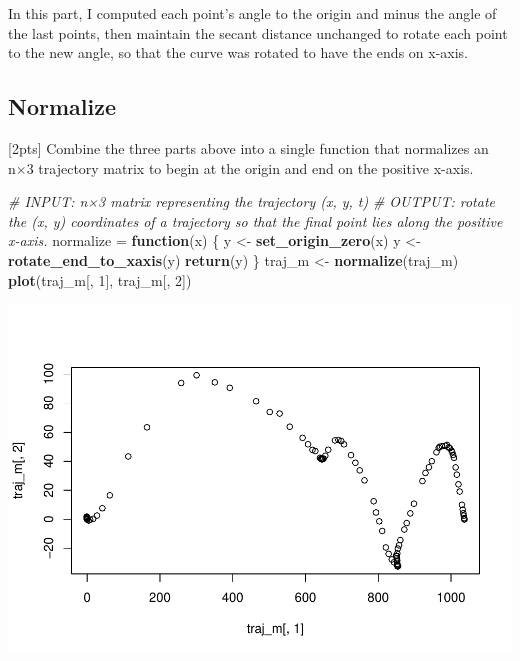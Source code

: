 \documentclass[]{article}
\newenvironment{Shaded}{\begin{snugshade}}{\end{snugshade}}
\newcommand{\CommentTok}[1]{\textcolor[rgb]{0.56,0.35,0.01}{\textit{#1}}}
\newcommand{\ControlFlowTok}[1]{\textcolor[rgb]{0.13,0.29,0.53}{\textbf{#1}}}
\newcommand{\DecValTok}[1]{\textcolor[rgb]{0.00,0.00,0.81}{#1}}
\newcommand{\KeywordTok}[1]{\textcolor[rgb]{0.13,0.29,0.53}{\textbf{#1}}}
\newcommand{\NormalTok}[1]{#1}
\newcommand{\StringTok}[1]{\textcolor[rgb]{0.31,0.60,0.02}{#1}}
\begin{document}
In this part, I computed each point's angle to the origin and minus the
angle of the last points, then maintain the secant distance unchanged to
rotate each point to the new angle, so that the curve was rotated to
have the ends on x-axis.

\hypertarget{normalize}{%
\subsection{Normalize}\label{normalize}}

{[}2pts{]} Combine the three parts above into a single function that
normalizes an n×3 trajectory matrix to begin at the origin and end on
the positive x-axis.

\begin{Shaded}
\begin{Highlighting}[]
\CommentTok{# INPUT: n×3 matrix representing the trajectory (x, y, t)}
\CommentTok{# OUTPUT: rotate the (x, y) coordinates of a trajectory so that the final point lies along the positive x-axis.}
\NormalTok{normalize =}\StringTok{ }\ControlFlowTok{function}\NormalTok{(x) \{}
\NormalTok{  y <-}\StringTok{ }\KeywordTok{set_origin_zero}\NormalTok{(x)}
\NormalTok{  y <-}\StringTok{ }\KeywordTok{rotate_end_to_xaxis}\NormalTok{(y)}
  \KeywordTok{return}\NormalTok{(y)}
\NormalTok{\}}
\NormalTok{traj_m <-}\StringTok{ }\KeywordTok{normalize}\NormalTok{(traj_m)}
\KeywordTok{plot}\NormalTok{(traj_m[, }\DecValTok{1}\NormalTok{], traj_m[, }\DecValTok{2}\NormalTok{])}
\end{Highlighting}
\end{Shaded}

\includegraphics{ps1_q3_files/figure-latex/unnamed-chunk-5-1.pdf}
\end{document}
